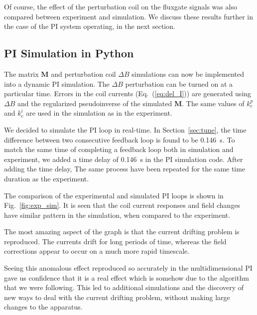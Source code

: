 Of course, the effect of the perturbation coil on the fluxgate signals
was also compared between experiment and simulation.  We discuss these
results further in the case of the PI system operating, in the next
section.


\subsection{PI Simulation in Python}

The matrix $\bm{M}$ and perturbation coil $\Delta B$ simulations can
now be implemented into a dynamic PI simulation.  The $\Delta B$
perturbation can be turned on at a particular time.  Errors in the
coil currents (Eq.~(\ref{eq:del_I})) are generated using $\Delta B$
and the regularized pseudoinverse of the simulated $\bm{M}$. The same values
of $k_c^p$ and $k_c^i$ are used in the simulation as in the experiment.

We decided to simulate the PI loop in real-time.  In
Section~\ref{sec:tune}, the time difference between two consecutive
feedback loop is found to be 0.146~s. To match the same time of
completing a feedback loop both in simulation and experiment, we added
a time delay of 0.146~s in the PI simulation code. After adding the
time delay, The same process have been repeated for the same time
duration as the experiment.

The comparison of the experimental and simulated PI loops is shown in
Fig.~\ref{fig:exp_sim}.  It is seen that the coil current responses
and field changes have similar pattern in the simulation, when
compared to the experiment.

The most amazing aspect of the graph is that the current drifting
problem is reproduced.  The currents drift for long periods of time,
whereas the field corrections appear to occur on a much more rapid
timescale.


Seeing this anomalous effect reproduced so accurately in the
multidimensional PI gave us confidence that it is a real effect which
is somehow due to the algorithm that we were following.  This led to
additional simulations and the discovery of new ways to deal with the
current drifting problem, without making large changes to the
apparatus.

